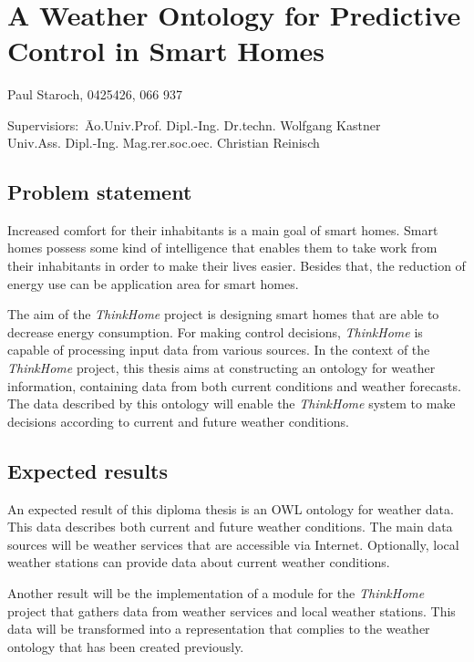 \documentclass{scrartcl}
\begin{document}
~\vspace{0.5cm}
\section*{A Weather Ontology for Predictive Control in Smart Homes}
Paul Staroch, 0425426, 066 937
\begin{tabbing}
Supervisiors:\ \= Ao.Univ.Prof. Dipl.-Ing. Dr.techn. Wolfgang Kastner\\
\> Univ.Ass. Dipl.-Ing. Mag.rer.soc.oec. Christian Reinisch
\end{tabbing}

\subsection*{Problem statement}
Increased comfort for their inhabitants is a main goal of smart homes. Smart homes possess some kind of intelligence that enables them to take work from their inhabitants in order to make their lives easier. Besides that, the reduction of energy use can be application area for smart homes.

The aim of the \textit{ThinkHome} project \cite{CR2011-TH_Journal} \cite{CR2010-DEST_ThinkHome} is designing smart homes that are able to decrease energy consumption. For making control decisions, \textit{ThinkHome} is capable of processing input data from various sources. In the context of the \textit{ThinkHome} project, this thesis aims at constructing an ontology for weather information, containing data from both current conditions and weather forecasts. The data described by this ontology will enable the \textit{ThinkHome} system to make decisions according to current and future weather conditions.

\subsection*{Expected results}
An expected result of this diploma thesis is an OWL ontology for weather data. This data describes both current and future weather conditions. The main data sources will be weather services that are accessible via Internet. Optionally, local weather stations can provide data about current weather conditions.

Another result will be the implementation of a module for the \textit{ThinkHome} project that gathers data from weather services and local weather stations. This data will be transformed into a representation that complies to the weather ontology that has been created previously.
\end{document}
